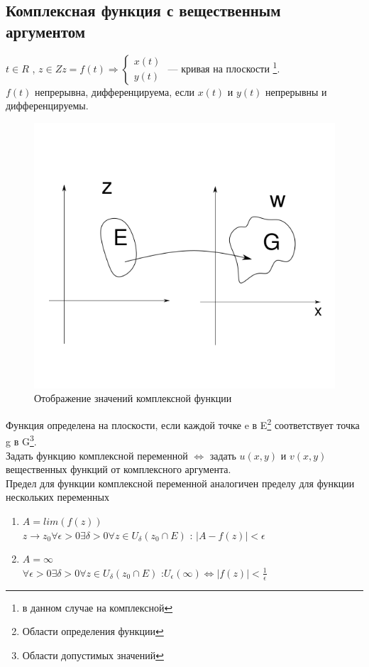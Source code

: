 \documentclass{article}
\begin{document}
           \subsection{Комплексная функция с вещественным аргументом}
             $ t \in R $ , $z \in Z z=f(t) \Rightarrow \begin{cases} x(t)\\y(t) \end{cases} $ --- кривая на плоскости \footnote{в данном случае на комплексной}.\\
             $f(t)$ непрерывна, дифференцируема, если $x(t)$ и $y(t)$ непрерывны и дифференцируемы.\\
             \begin{figure}[H]
                  \includegraphics[width=0.6\linewidth]{complex_imagine_example}
                  \caption{Отображение значений комплексной функции}
                  \label{ris:complex_imagine_example}
              \end{figure}
         Функция определена на плоскости, если каждой точке e в E\footnote{Области определения функции} соответствует точка g в G\footnote{ Области допустимых значений}.\\ Задать функцию комплексной переменной $\Leftrightarrow$ задать $u(x,y)$ и $v(x,y)$ вещественных функций от комплексного аргумента.\\
         Предел для функции комплексной переменной аналогичен пределу для функции нескольких переменных
           \begin{enumerate}
             \item $A=lim(f(z))$\\
             $z \rightarrow z_{0} \forall \epsilon>0 \exists \delta>0 \forall z \in U _{ \delta }(z_{0} \cap E)$ : $|A-f(z)|< \epsilon$
             \item $A=\infty$ \\
             $\forall \epsilon>0 \exists \delta>0 \forall z \in U _{ \delta }(z_{0} \cap E)$ :$ U_{\epsilon}(\infty) \Leftrightarrow |f(z)|< \frac{1}{\epsilon}$
           \end{enumerate}
\end{document}
